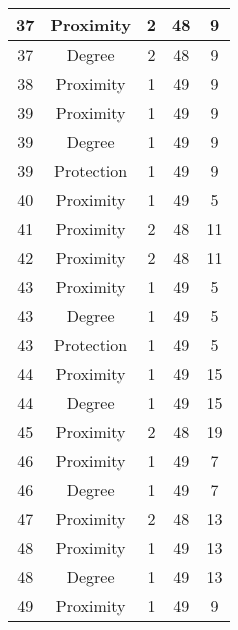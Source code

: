 \documentclass[results.tex]{subfiles}
\begin{document}
\begin{center}
\begin{tabular}{| c || c | c | c | c |}
    \hline
    37 & Proximity & 2 & 48 & 9 \\ 
    \hline
    37 & Degree & 2 & 48 & 9 \\ 
    \hline
    38 & Proximity & 1 & 49 & 9 \\ 
    \hline
    39 & Proximity & 1 & 49 & 9 \\ 
    \hline
    39 & Degree & 1 & 49 & 9 \\ 
    \hline
    39 & Protection & 1 & 49 & 9 \\ 
    \hline
    40 & Proximity & 1 & 49 & 5 \\ 
    \hline
    41 & Proximity & 2 & 48 & 11 \\ 
    \hline
    42 & Proximity & 2 & 48 & 11 \\ 
    \hline
    43 & Proximity & 1 & 49 & 5 \\ 
    \hline
    43 & Degree & 1 & 49 & 5 \\ 
    \hline
    43 & Protection & 1 & 49 & 5 \\ 
    \hline
    44 & Proximity & 1 & 49 & 15 \\ 
    \hline
    44 & Degree & 1 & 49 & 15 \\ 
    \hline
    45 & Proximity & 2 & 48 & 19 \\ 
    \hline
    46 & Proximity & 1 & 49 & 7 \\ 
    \hline
    46 & Degree & 1 & 49 & 7 \\ 
    \hline
    47 & Proximity & 2 & 48 & 13 \\ 
    \hline
    48 & Proximity & 1 & 49 & 13 \\ 
    \hline
    48 & Degree & 1 & 49 & 13 \\ 
    \hline
    49 & Proximity & 1 & 49 & 9 \\ 
    \hline   \end{tabular}
\end{center}
\end{document}
